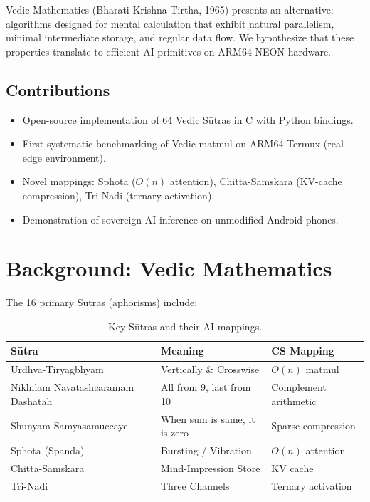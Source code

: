 \documentclass[12pt, a4paper]{article}
\begin{document}
Vedic Mathematics (Bharati Krishna Tirtha, 1965) presents an alternative: algorithms designed for mental calculation that exhibit natural parallelism, minimal intermediate storage, and regular data flow. We hypothesize that these properties translate to efficient AI primitives on ARM64 NEON hardware.

\subsection{Contributions}
\begin{itemize}
    \item Open-source implementation of 64 Vedic S\={u}tras in C with Python bindings.
    \item First systematic benchmarking of Vedic matmul on ARM64 Termux (real edge environment).
    \item Novel mappings: Sphota ($O(n)$ attention), Chitta-Samskara (KV-cache compression), Tri-Nadi (ternary activation).
    \item Demonstration of sovereign AI inference on unmodified Android phones.
\end{itemize}

\section{Background: Vedic Mathematics}

The 16 primary S\={u}tras (aphorisms) include:

\begin{table}[h]
\centering
\begin{tabular}{lll}
\toprule
\textbf{S\={u}tra} & \textbf{Meaning} & \textbf{CS Mapping} \\
\midrule
Urdhva-Tiryagbhyam & Vertically \& Crosswise & $O(n)$ matmul \\
Nikhilam Navatashcaramam Dashatah & All from 9, last from 10 & Complement arithmetic \\
Shunyam Samyasamuccaye & When sum is same, it is zero & Sparse compression \\
Sphota (Spanda) & Bursting / Vibration & $O(n)$ attention \\
Chitta-Samskara & Mind-Impression Store & KV cache \\
Tri-Nadi & Three Channels & Ternary activation \\
\bottomrule
\end{tabular}
\caption{Key S\={u}tras and their AI mappings.}
\end{table}
\end{document}
